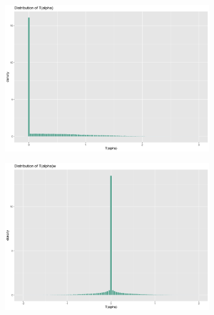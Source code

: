 \begin{figure}[t]
     \centering
     \begin{subfigure}[b]{0.49\textwidth}
         \centering
         \includegraphics[width=\textwidth]{Figures/SpSLprior1.png}
     \end{subfigure}
     \hfill
     \begin{subfigure}[b]{0.49\textwidth}
         \centering
         \includegraphics[width=\textwidth]{Figures/SpSLprior2.png}
     \end{subfigure}
     \hfill
     \begin{subfigure}[b]{0.49\textwidth}
         \centering

\end{subfigure}
\end{figure}
